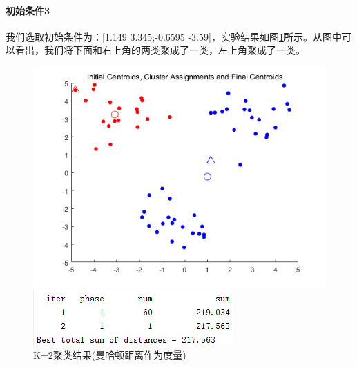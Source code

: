 \documentclass[cn]{elegantbook}
\begin{document}
\paragraph{初始条件3}
我们选取初始条件为：[1.149 3.345;-0.6595 -3.59]，实验结果如图\ref{res23}所示。从图中可以看出，我们将下面和右上角的两类聚成了一类，左上角聚成了一类。
\begin{figure}[!h]
	\centering
	\begin{minipage}{0.48\linewidth}
		\centering
		\includegraphics[width=\linewidth]{images/res23}
	\end{minipage}
	\begin{minipage}{0.48\linewidth}
		\centering
		\includegraphics[width=\linewidth]{images/res231}
	\end{minipage}
	\caption{\label{res23}K=2聚类结果(曼哈顿距离作为度量)}
\end{figure}
\end{document}
